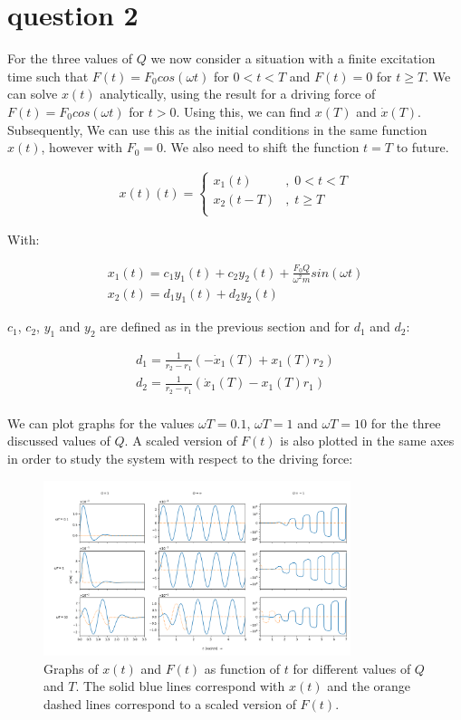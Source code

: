 \section{question 2}

For the three values of $Q$ we now consider a situation with a finite excitation time such that $F(t) = F_0 cos(\omega t)$ for $0 < t < T$ and $F(t) = 0$ for $t \geq T$. We can solve $x(t)$ analytically, using the result for a driving force of $F(t) = F_0 cos(\omega t)$ for $t > 0$. Using this, we can find $x(T)$ and $\dot{x}(T)$. Subsequently, We can use this as the initial conditions in the same function $x(t)$, however with $F_0 = 0$. We also need to shift the function $t=T$ to future. 

\begin{align*}
	x(t)(t) = \begin{cases} 
		x_1(t) & , \; 0 < t < T \\
		x_2(t-T) & , \; t \geq T \\
		\end{cases}
\end{align*}

With:

\begin{align*}
	x_1(t) = c_1 y_1(t) + c_2 y_2(t) + \frac{F_0 Q}{\omega^2 m}sin(\omega t) \\
	x_2(t) = d_1 y_1(t) + d_2 y_2(t)
\end{align*}

$c_1$, $c_2$, $y_1$ and $y_2$ are defined as in the previous section and for $d_1$ and $d_2$:

\begin{align*}
	d_1 = \frac{1}{r_2-r_1} \left( -\dot{x}_1(T) + x_1(T) r_2 \right) \\
	d_2 = \frac{1}{r_2-r_1} \left( \dot{x}_1(T)  - x_1(T) r_1 \right) \\
\end{align*}

We can plot graphs for the values $\omega T = 0.1$, $\omega T = 1$ and $\omega T = 10$ for the three discussed values of $Q$. A scaled version of $F(t)$ is also plotted in the same axes in order to study the system with respect to the driving force:

\begin{figure}[h!] 
	\centering
	\includegraphics[width=0.8\textwidth]{figures/graph_q2.png}
	\caption{Graphs of $x(t)$ and $F(t)$  as function of $t$ for different values of $Q$ and $T$. The solid blue lines correspond with $x(t)$ and the orange dashed lines correspond to a scaled version of $F(t)$.}
	\label{fig_q1}
\end{figure}

